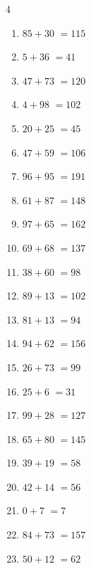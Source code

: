 \begin{multicols}{4}
\begin{enumerate}
  \item $85+30$
        $=115$

  \item $5+36$
        $=41$

  \item $47+73$
        $=120$

  \item $4+98$
        $=102$

  \item $20+25$
        $=45$

  \item $47+59$
        $=106$

  \item $96+95$
        $=191$

  \item $61+87$
        $=148$

  \item $97+65$
        $=162$

  \item $69+68$
        $=137$

  \item $38+60$
        $=98$

  \item $89+13$
        $=102$

  \item $81+13$
        $=94$

  \item $94+62$
        $=156$

  \item $26+73$
        $=99$

  \item $25+6$
        $=31$

  \item $99+28$
        $=127$

  \item $65+80$
        $=145$

  \item $39+19$
        $=58$

  \item $42+14$
        $=56$

  \item $0+7$
        $=7$

\columnbreak %

  \item $84+73$
        $=157$

  \item $50+12$
        $=62$


\end{enumerate}
\end{multicols}
